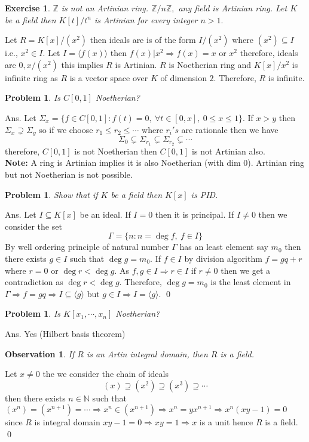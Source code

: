 \documentclass[11pt]{amsart}
\newtheorem{problem}[theorem]{Problem}
\newtheorem{ex}[theorem]{Exercise}
\newtheorem{obs}[theorem]{Observation}
\newcommand{\ZZ}{\mathbb Z}
\newcommand{\NN}{\mathbb N}
\newcommand{\gen}[1]{\langle#1\rangle}
\begin{document}
\begin{ex}
${\ZZ}$ is not an Artinian ring. ${\ZZ}/n{\ZZ},$ any field is Artinian ring. Let $K$ be a field then $K[t]/t^n$ is Artinian for every integer $n>1.$
\end{ex}
Let $R=K[x]/(x^2)$ then ideals are is of the form $I/(x^2)$ where $(x^2)\subseteq I$ i.e., $x^2\in I.$ Let $I=\gen{f(x)}$ then $f(x)|x^2 \Rightarrow f(x)=x $ or $x^2$ therefore, ideals are $0,x/(x^2)$ this implies $R$ is Artinian. $R$ is Noetherian ring and $K[x]/x^2$ is infinite ring as $R$ is a vector space over $K$ of dimension $2.$ Therefore, $R$ is infinite.
\begin{problem}
Is $C[0,1]$ Noetherian?
\end{problem}
Ans. Let $\Sigma_x=\{f\in C[0,1]:f(t)=0,~\forall t\in [0,x],~0\leq x\leq 1\}.$ If $x>y$ then $\Sigma_x\supsetneq \Sigma_y$ so if we choose $r_1\leq r_2\leq \cdots$ where $r_i's$ are rationale then we have $$\Sigma_0\subsetneq \Sigma_{r_1}\subsetneq \Sigma_{r_2}\subsetneq \cdots $$ therefore, $C[0,1]$ is not Noetherian then $C[0,1]$ is not Artinian also.\\
\textbf{Note:} A ring is Artinian implies it is also Noetherian (with dim 0). Artinian ring but not Noetherian is not possible.
\begin{problem}
Show that if $K$ be a field then $K[x]$ is PID.
\end{problem}
Ans. Let $I\subseteq K[x]$ be an ideal. If $I=0$ then it is principal. If $I\neq 0$ then we consider the set $$\Gamma=\{n:n=\deg f,~f\in I\}$$ By well ordering principle of natural number $\Gamma$ has an least element  say $m_0$ then there exists $g\in I$ such that $\deg g=m_0.$ If $f\in I$ by division algorithm $f=gq+r$ where $r=0$ or $\deg r< \deg g.$ As $f,g\in I \Rightarrow r\in I$ if $r\neq 0$ then we get a contradiction as $\deg r<\deg g.$ Therefore, $\deg g=m_0$ is the least element in $\Gamma \Rightarrow f=gq \Rightarrow I\subseteq \gen{g}$ but $g\in I \Rightarrow I=\gen{g}.$ \qed
\begin{problem}
Is $K[x_1,\cdots ,x_n]$ Noetherian?
\end{problem}
Ans. Yes (Hilbert basis theorem)
\begin{obs}
If $R$ is an Artin integral domain, then $R$ is a field.
\end{obs}

\proof Let $x\neq 0$ the we consider the chain of ideals $$(x)\supseteq (x^2)\supseteq (x^3)\supseteq \cdots $$ then there exists $n\in {\NN}$ such that $(x^n)=(x^{n+1})=\cdots \Rightarrow x^n\in (x^{n+1}) \Rightarrow x^n=yx^{n+1} \Rightarrow x^n(xy-1)=0$ since $R$ is integral domain $xy-1=0 \Rightarrow xy=1 \Rightarrow x$ is a unit hence $R$ is a field. \qed
\end{document}
